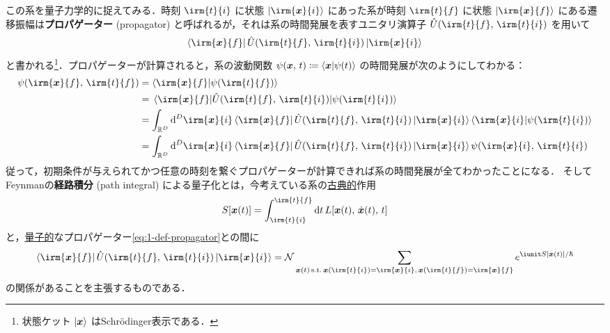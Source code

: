 \documentclass[TQFT_main]{subfiles}
\begin{document}
この系を量子力学的に捉えてみる．時刻 $\irm{t}{i}$ に状態 $\ket{\irm{\bm{x}}{i}}$ にあった系が時刻 $\irm{t}{f}$ に状態 $\ket{\irm{\bm{x}}{f}}$ にある遷移振幅は\textbf{プロパゲーター} (propagator) と呼ばれるが，それは系の時間発展を表すユニタリ演算子 $\hat{U}(\irm{t}{f},\, \irm{t}{i})$ を用いて
\begin{align}
    \label{eq:1-def-propagator}
    \bra{\irm{\bm{x}}{f}} \hat{U}(\irm{t}{f},\, \irm{t}{i}) \ket{\irm{\bm{x}}{i}}
\end{align}
と書かれる\footnote{状態ケット $\ket{\bm{x}}$ はSchr\"{o}dinger表示である．}．プロパゲーターが計算されると，系の波動関数 $\psi(\bm{x},\, t) \coloneqq \braket{\bm{x}}{\psi(t)}$ の時間発展が次のようにしてわかる：
\begin{align}
    \psi(\irm{\bm{x}}{f},\, \irm{t}{f}) 
    &= \braket{\irm{\bm{x}}{f}}{\psi(\irm{t}{f})} \\
    &= \mel{\irm{\bm{x}}{f}}{\hat{U}(\irm{t}{f},\, \irm{t}{i})}{\psi(\irm{t}{i})} \\
    &= \int_{\mathbb{R}^D} \dd[D]{\irm{\bm{x}}{i}} \bra{\irm{\bm{x}}{f}} \hat{U}(\irm{t}{f},\, \irm{t}{i}) \ket{\irm{\bm{x}}{i}} \braket{\irm{\bm{x}}{i}}{\psi(\irm{t}{i})} \\ 
    &= \int_{\mathbb{R}^D} \dd[D]{\irm{\bm{x}}{i}} \bra{\irm{\bm{x}}{f}} \hat{U}(\irm{t}{f},\, \irm{t}{i}) \ket{\irm{\bm{x}}{i}} \psi(\irm{\bm{x}}{i},\, \irm{t}{i})
\end{align}
従って，初期条件が与えられてかつ任意の時刻を繋ぐプロパゲーターが計算できれば系の時間発展が全てわかったことになる．
そしてFeynmanの\textbf{経路積分} (path integral) による量子化とは，今考えている系の\underline{古典的}作用 
\begin{align}
    S[\bm{x}(t)] = \int_{\irm{t}{i}}^{\irm{t}{f}} \dd{t} L [\bm{x}(t),\, \dot{\bm{x}} (t),\, t]
\end{align}
と，\underline{量子的}なプロパゲーター\eqref{eq:1-def-propagator}との間に
\begin{align}
    \label{eq:1-pathintegral}
    \bra{\irm{\bm{x}}{f}} \hat{U}(\irm{t}{f},\, \irm{t}{i}) \ket{\irm{\bm{x}}{i}} = \mathcal{N} \sum_{\bm{x} (t)\, \mathrm{s.t.}\, \bm{x} (\irm{t}{i}) = \irm{\bm{x}}{i},\, \bm{x} (\irm{t}{f}) = \irm{\bm{x}}{f}} e^{\iunit S[\bm{x}(t)] / \hbar}
\end{align}
の関係があることを主張するものである．
\end{document}
